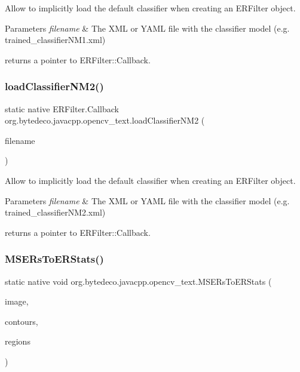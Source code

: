 Allow to implicitly load the default classifier when creating an E\+R\+Filter object. 


\begin{DoxyParams}{Parameters}
{\em filename} & The X\+ML or Y\+A\+ML file with the classifier model (e.\+g. trained\+\_\+classifier\+N\+M1.\+xml) \\
\hline
\end{DoxyParams}
returns a pointer to E\+R\+Filter\+::\+Callback. \mbox{\label{group__text__detect_gaa41f7358b2e47c7e2b2831ad76410221}} 
\subsubsection{\texorpdfstring{load\+Classifier\+N\+M2()}{loadClassifierNM2()}}
{\footnotesize\ttfamily static native E\+R\+Filter.\+Callback org.\+bytedeco.\+javacpp.\+opencv\+\_\+text.\+load\+Classifier\+N\+M2 (\begin{DoxyParamCaption}\item[{@Str Byte\+Pointer}]{filename }\end{DoxyParamCaption})\hspace{0.3cm}{\ttfamily [static]}}



Allow to implicitly load the default classifier when creating an E\+R\+Filter object. 


\begin{DoxyParams}{Parameters}
{\em filename} & The X\+ML or Y\+A\+ML file with the classifier model (e.\+g. trained\+\_\+classifier\+N\+M2.\+xml) \\
\hline
\end{DoxyParams}
returns a pointer to E\+R\+Filter\+::\+Callback. \mbox{\label{group__text__detect_gad4c72b60ca712eeab78c52b946f649a2}} 
\subsubsection{\texorpdfstring{M\+S\+E\+Rs\+To\+E\+R\+Stats()}{MSERsToERStats()}}
{\footnotesize\ttfamily static native void org.\+bytedeco.\+javacpp.\+opencv\+\_\+text.\+M\+S\+E\+Rs\+To\+E\+R\+Stats (\begin{DoxyParamCaption}\item[{@By\+Val Mat}]{image,  }\item[{@By\+Ref Point\+Vector\+Vector}]{contours,  }\item[{@By\+Ref E\+R\+Stat\+Vector\+Vector}]{regions }\end{DoxyParamCaption})\hspace{0.3cm}{\ttfamily [static]}}



